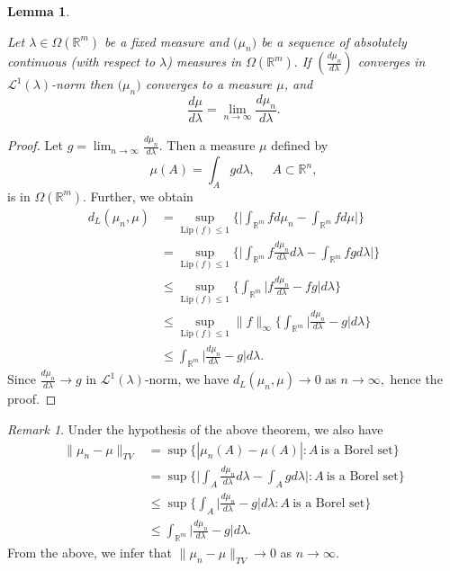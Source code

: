 \documentclass{amsproc}
\newtheorem{lemma}[theorem]{Lemma}
\theoremstyle{definition}
\theoremstyle{remark}
\newtheorem{remark}[theorem]{Remark}
\numberwithin{equation}{section}
\newcommand{\te}{\text}%
\begin{document}
\begin{lemma}\label{lemcon1}
            
Let $\lambda \in \Omega( \mathbb{R}^m)$ be a fixed measure and $\big(\mu_n\big)$ be a sequence of absolutely continuous (with respect to $\lambda$) measures in $\Omega( \mathbb{R}^m).$ If $(\frac{d\mu_n}{d\lambda})$ converges in $\mathcal{L}^1(\lambda)$-norm then $\big(\mu_n\big)$ converges to a measure $\mu$, and
$$
\frac{d\mu}{d\lambda}=\lim_{n \to \infty }\frac{d\mu_n}{d\lambda}.
$$
\end{lemma}
\begin{proof}
Let $g= \lim_{n \to \infty} \frac{d\mu_n}{d\lambda}.$ Then a measure $\mu$ defined by $$\mu(A)= \int_A g d\lambda, ~~ ~~~~ A \subset \mathbb{R}^n,$$
is in $ \Omega( \mathbb{R}^m).$ Further, we obtain 
\begin{equation*}
\begin{aligned}
d_L(\mu_n,\mu)& =\sup_{\te{Lip}(f)\leq 1} \Big\{\Big|\int_{\mathbb{R}^m} f d\mu_n -\int_{\mathbb{R}^m} fd\mu \Big|\Big\} \\ & = \sup_{\te{Lip}(f)\leq 1} \Big\{\Big|\int_{\mathbb{R}^m} f  \frac{d\mu_n}{d\lambda} d\lambda -\int_{\mathbb{R}^m} fgd\lambda \Big|\Big\} \\ & \le  \sup_{\te{Lip}(f)\leq 1} \Big\{\int_{\mathbb{R}^m} \Big|f  \frac{d\mu_n}{d\lambda} -fg \Big|d\lambda\Big\} \\ & \le  \sup_{\te{Lip}(f)\leq 1} \|f\|_{\infty} \Big\{\int_{\mathbb{R}^m} \Big|  \frac{d\mu_n}{d\lambda} -g \Big|d\lambda\Big\} \\ & \le   \int_{\mathbb{R}^m} \Big|  \frac{d\mu_n}{d\lambda} -g \Big|d\lambda.
\end{aligned}
\end{equation*}
Since $\frac{d\mu_n}{d\lambda} \to g$ in $\mathcal{L}^1(\lambda)$-norm, we have $d_L(\mu_n,\mu) \to 0$ as $n \to \infty,$ hence the proof.
\end{proof}
\begin{remark}
Under the hypothesis of the above theorem, we also have 
\begin{equation*}
\begin{aligned}
\|\mu_n-\mu\|_{TV}& =\sup\{|\mu_n(A)- \mu (A)|: A ~\text{is a Borel set}\}\\ & = \sup\Big\{\Big|\int_{A}   \frac{d\mu_n}{d\lambda} d\lambda -\int_{A} gd\lambda \Big| : A ~\text{is a Borel set}\Big\} \\ & \le  \sup \Big\{\int_{A} \Big|  \frac{d\mu_n}{d\lambda} -g \Big|d\lambda:  A ~\text{is a Borel set}\Big\} \\ & \le   \int_{\mathbb{R}^m} \Big|  \frac{d\mu_n}{d\lambda} -g \Big|d\lambda.
\end{aligned}
\end{equation*}
From the above, we infer that $\|\mu_n-\mu\|_{TV} \to 0$ as $n \to \infty.$
\end{remark}
\end{document}
